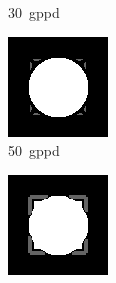 \begin{figure}[ht]
\begin{subfigure}{0.32\linewidth}
    \caption{\SI{30}{gppd}}
  \end{subfigure}
  \hfill
  \begin{subfigure}{0.32\linewidth}
    \centering
    \includegraphics[width=\linewidth]{images/A4_50gppd.png}
    \caption{\SI{50}{gppd}}
  \end{subfigure}
  \hfill
  \begin{subfigure}{0.32\linewidth}
    \centering
    \includegraphics[width=\linewidth]{images/A4_100gppd.png}

\end{subfigure}
\end{figure}

